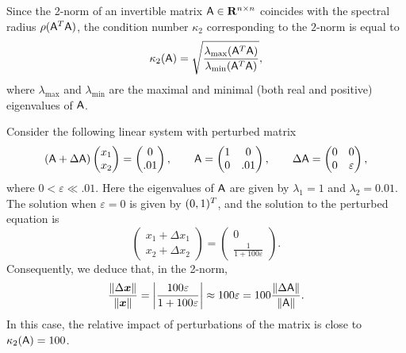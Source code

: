 Since the 2-norm of an invertible matrix $\mat A \in \real^{n \times n}$ coincides with the spectral radius $\rho(\mat A^\t \mat A)$,
the condition number $\kappa_2$ corresponding to the $2$-norm is equal to
\[
    \kappa_2(\mat A) = \sqrt{\frac{\lambda_{\max}(\mat A^\t \mat A)}{\lambda_{\min}(\mat A^\t \mat A)}},
\]
where $\lambda_{\max}$ and $\lambda_{\min}$ are the maximal and minimal (both real and positive) eigenvalues of $\mat A$.
\begin{example}
    Consider the following linear system
    with perturbed matrix
    \[
        (\mat A + \Delta \mat A)
        \begin{pmatrix}
            x_1 \\
            x_2
        \end{pmatrix}
        = \begin{pmatrix}
            0 \\
            .01
        \end{pmatrix},
        \qquad
        \mat A
        = \begin{pmatrix}
            1 & 0 \\
            0 & .01
        \end{pmatrix},
        \qquad
        \Delta \mat A =
        \begin{pmatrix}
            0 & 0 \\
            0 & \varepsilon
        \end{pmatrix},
    \]
    where $0 < \varepsilon \ll .01$.
    Here the eigenvalues of $\mat A$ are given by $\lambda_1 = 1$ and $\lambda_2 = 0.01$.
    The solution when $\varepsilon = 0$ is given by $(0, 1)^\t$,
    and the solution to the perturbed equation is
    \[
        \begin{pmatrix}
        x_1 + \Delta x_1 \\
        x_2 + \Delta x_2
        \end{pmatrix}
        =
        \begin{pmatrix}
            0 \\
            \frac{1}{1 + 100 \varepsilon}
        \end{pmatrix}.
    \]
    Consequently, we deduce that, in the 2-norm,
    \[
        \frac{\norm{\Delta \vect x}}{\norm{\vect x}}
        = \abs*{\frac{100 \varepsilon}{1 + 100 \varepsilon}}
        \approx 100 \varepsilon
        = 100 \frac{\norm{\Delta \mat A}}{\norm{\mat A}}.
    \]
    In this case,
    the relative impact of perturbations of the matrix is close to $\kappa_2(\mat A) = 100$.
\end{example}

